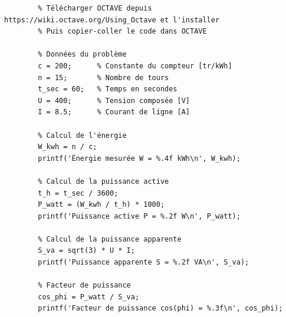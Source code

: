 \documentclass[a4paper,11pt,answers,addpoints]{exam}
\begin{document}
\begin{questions}
\begin{solution}
	
	\begin{verbatim}
		% Télécharger OCTAVE depuis https://wiki.octave.org/Using_Octave et l'installer
		% Puis copier-coller le code dans OCTAVE
		
		% Données du problème
		c = 200;      % Constante du compteur [tr/kWh]
		n = 15;       % Nombre de tours
		t_sec = 60;   % Temps en secondes
		U = 400;      % Tension composée [V]
		I = 8.5;      % Courant de ligne [A]
		
		% Calcul de l'énergie
		W_kwh = n / c;
		printf('Énergie mesurée W = %.4f kWh\n', W_kwh);
		
		% Calcul de la puissance active
		t_h = t_sec / 3600;
		P_watt = (W_kwh / t_h) * 1000;
		printf('Puissance active P = %.2f W\n', P_watt);
		
		% Calcul de la puissance apparente
		S_va = sqrt(3) * U * I;
		printf('Puissance apparente S = %.2f VA\n', S_va);
		
		% Facteur de puissance
		cos_phi = P_watt / S_va;
		printf('Facteur de puissance cos(phi) = %.3f\n', cos_phi);
	\end{verbatim}
\end{solution}


\end{questions}
\end{document}
